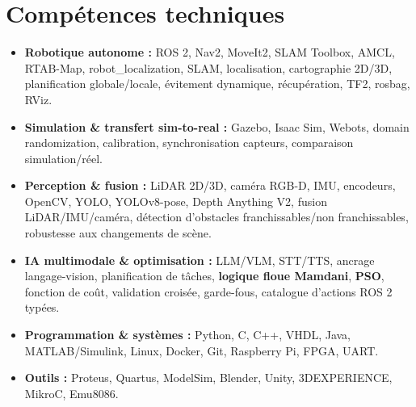 \documentclass[11pt,a4paper]{article}
\begin{document}
\section{Compétences techniques}
\begin{itemize}[leftmargin=*, nosep]
    \item \textbf{Robotique autonome :} ROS 2, Nav2, MoveIt2, SLAM Toolbox, AMCL, RTAB-Map, robot\_localization, SLAM, localisation, cartographie 2D/3D, planification globale/locale, évitement dynamique, récupération, TF2, rosbag, RViz.
    \item \textbf{Simulation \& transfert sim-to-real :} Gazebo, Isaac Sim, Webots, domain randomization, calibration, synchronisation capteurs, comparaison simulation/réel.
    \item \textbf{Perception \& fusion :} LiDAR 2D/3D, caméra RGB-D, IMU, encodeurs, OpenCV, YOLO, YOLOv8-pose, Depth Anything V2, fusion LiDAR/IMU/caméra, détection d'obstacles franchissables/non franchissables, robustesse aux changements de scène.
    \item \textbf{IA multimodale \& optimisation :} LLM/VLM, STT/TTS, ancrage langage-vision, planification de tâches, \textbf{logique floue Mamdani}, \textbf{PSO}, fonction de coût, validation croisée, garde-fous, catalogue d'actions ROS 2 typées.
    \item \textbf{Programmation \& systèmes :} Python, C, C++, VHDL, Java, MATLAB/Simulink, Linux, Docker, Git, Raspberry Pi, FPGA, UART.
    \item \textbf{Outils :} Proteus, Quartus, ModelSim, Blender, Unity, 3DEXPERIENCE, MikroC, Emu8086.
\end{itemize}

\end{document}
